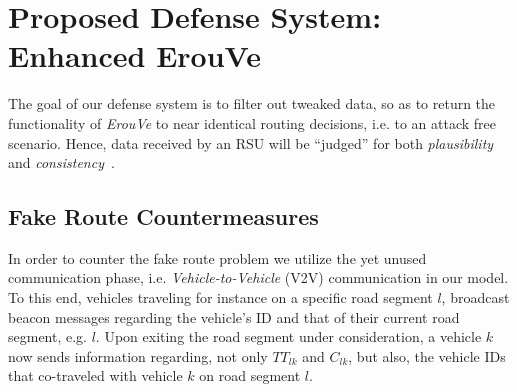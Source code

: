 \documentclass[conference]{IEEEtran}
\begin{document}
\begin{comment}
With the above consideration, we state a set of rules for a successful attack:\\
\textcolor{red}{is it simply repeated?}

\begin{enumerate}
\item First, accumulated data should be altered to an extent that would not easily alert the corresponding RSU, also mentioned in~\cite{} (although in a different use-case)
\item Second, vehicles should be sent in groups so as to have a serious impact in the order of  weighted roads as accumulated by {\it ErouVe} and thus affect 
the routing decisions
\item Third, attackers should be sent in a well scheduled basis, so as to continuously have fault information in the system\\
\end{enumerate}
\end{comment}




\section{Proposed Defense System: Enhanced ErouVe}
\label{prop-defense}

The goal of our defense system is to filter out tweaked data, so as to return the functionality of {\it ErouVe} to near identical routing decisions, i.e. to an attack
free scenario. Hence, data received by an RSU will be ``judged'' for both {\it plausibility} and {\it consistency}~\cite{khan2015detailed}. 

\subsection{Fake Route Countermeasures}

In order to counter the fake route problem we utilize the yet unused communication phase, i.e.  {\it Vehicle-to-Vehicle} (V2V) communication in our model.
 To this end, vehicles traveling for instance on a specific road segment $l$, broadcast beacon messages regarding the vehicle's ID and that of their 
current road segment, e.g.  $l$. Upon exiting the road segment under consideration, a vehicle $k$ 
now sends information regarding, not only $TT_{lk}$ and $C_{lk}$, but also, the vehicle IDs that co-traveled with vehicle $k$ on road segment $l$. 
\end{document}
